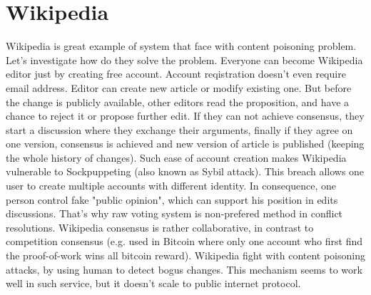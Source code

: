 \documentclass[nostrict]{szablonPG}
\begin{document}
\section{Wikipedia}
Wikipedia is great example of system that face with content poisoning problem. Let's investigate how do they solve the problem. 
Everyone can become Wikipedia editor just by creating free account. Account reqistration doesn't even require email address. Editor can create new article or modify existing one. But before the change is publicly available, other editors read the proposition, and have a chance to reject it or propose further edit. If they can not achieve consensus, they start a discussion where they exchange their arguments, finally if they agree on one version, consensus is achieved and new version of article is published (keeping the whole history of changes).
Such ease of account creation makes Wikipedia vulnerable to Sockpuppeting (also known as Sybil attack). This breach allows one user to create multiple accounts with different identity. In consequence, one person control fake "public opinion", which can support his position in edits discussions. That's why raw voting system is non-prefered method in conflict resolutions. Wikipedia consensus is rather collaborative, in contrast to competition consensus (e.g. used in Bitcoin where only one account who first find the proof-of-work wins all bitcoin reward). 
Wikipedia fight with content poisoning attacks, by using human to detect bogus changes. This mechanism seems to work well in such service, but it doesn't scale to public internet protocol.
\end{document}
